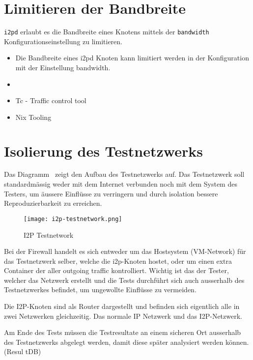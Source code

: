 \section{Limitieren der Bandbreite}

\lstinline|i2pd|
erlaubt es die Bandbreite eines Knotens  mittels der \lstinline|bandwidth| Konfigurationseinstellung  zu limitieren.

\begin{itemize}
    \item Die Bandbreite eines i2pd Knoten kann limitiert werden in der Konfiguration mit der Einstellung bandwidth.  
    \item \cite{noauthor_i2p_nodate-3}
    \item Tc - Traffic control tool
    \item Nix Tooling
\end{itemize}

\section{Isolierung des Testnetzwerks}
\label{sec:isolierung}

Das Diagramm~ zeigt den Aufbau des Testnetzwerks auf. Das Testnetzwerk soll standardmässig weder mit dem Internet verbunden noch mit dem System des Testers, um äussere Einflüsse zu verringern und durch isolation bessere Reproduzierbarkeit zu erreichen.

\begin{figure*}[ht]
  \texttt{[image: i2p-testnetwork.png]}
  \caption{I2P Testnetwork}\label{fig:i2p-testnetwork}
\end{figure*}

Bei der Firewall handelt es sich entweder um das Hostsystem (VM-Network) für das Testnetzwerk selber, welche die i2p-Knoten hostet, oder um einen extra Container der aller outgoing traffic kontrolliert.
Wichtig ist das der Tester, welcher das Netzwerk erstellt und die Tests durchführt sich auch ausserhalb des Testnetzwerkes befindet, um ungewollte Einflüsse zu vermeiden.

Die I2P-Knoten sind als Router dargestellt und befinden sich eigentlich alle in zwei Netzwerken gleichzeitig. Das normale IP Netzwerk und das I2P-Netzwerk.

Am Ende des Tests müssen die Testresultate an einem sicheren Ort ausserhalb des Testnetzwerks abgelegt werden, damit diese später analysiert werden können. (Resul tDB)

